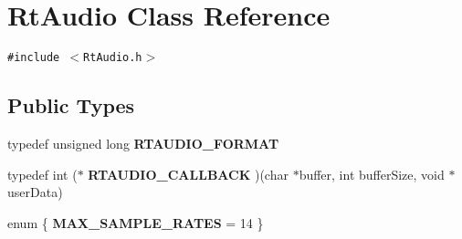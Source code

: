 \section{Rt\-Audio  Class Reference}
\label{classRtAudio}
{\tt \#include $<$Rt\-Audio.h$>$}

\subsection*{Public Types}
\begin{CompactItemize}
\item 
typedef unsigned long {\bf RTAUDIO\_\-FORMAT}
\item 
typedef int ($\ast$ {\bf RTAUDIO\_\-CALLBACK} )(char $\ast$buffer, int buffer\-Size, void $\ast$user\-Data)
\item 
enum \{ {\bf MAX\_\-SAMPLE\_\-RATES} =  14 
 \}
\end{CompactItemize}
